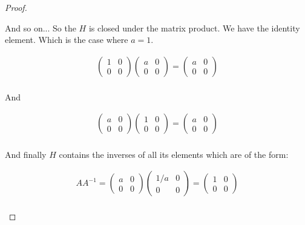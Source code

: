 \documentclass[12pt,leqno]{article}
\numberwithin{equation}{section}
\theoremstyle{definition}
\begin{document}
\begin{proof}[Proof]
\begin{enumerate}
    And so on... So the $H$ is closed under the matrix product. We have the
    identity element.  Which is the case where $a = 1$.

    \begin{align*}
         \left( 
        \begin{array}{cc}
            1 & 0 \\
            0 & 0
        \end{array} \right)
         \left( 
        \begin{array}{cc}
            a & 0 \\
            0 & 0
        \end{array} \right) 
        = 
         \left( 
        \begin{array}{cc}
            a & 0 \\
            0 & 0
        \end{array} \right)  \\
    \end{align*}

    And

    \begin{align*}
         \left( 
        \begin{array}{cc}
            a & 0 \\
            0 & 0
        \end{array} \right)
         \left( 
        \begin{array}{cc}
            1 & 0 \\
            0 & 0
        \end{array} \right) 
        = 
         \left( 
        \begin{array}{cc}
            a & 0 \\
            0 & 0
        \end{array} \right)  \\
    \end{align*}

    And finally $H$ contains the inverses of all its elements which are of the
    form:

    \begin{align*}
        AA^{-1} = 
         \left( 
        \begin{array}{cc}
            a & 0 \\
            0 & 0
        \end{array} \right)
         \left( 
        \begin{array}{cc}
            1/a & 0 \\
            0 & 0
        \end{array} \right) 
        = 
         \left( 
        \begin{array}{cc}
            1 & 0 \\
            0 & 0
        \end{array} \right)  \\
    \end{align*}
    
\end{enumerate}
\end{proof}
\end{document}
